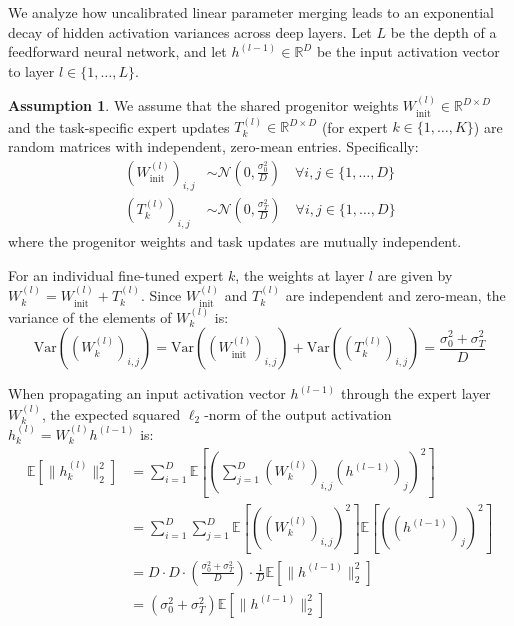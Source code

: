 \documentclass{article}
\theoremstyle{plain}
\theoremstyle{definition}
\newtheorem{assumption}[theorem]{Assumption}
\theoremstyle{remark}
\begin{document}
We analyze how uncalibrated linear parameter merging leads to an exponential decay of hidden activation variances across deep layers. Let $L$ be the depth of a feedforward neural network, and let $h^{(l-1)} \in \mathbb{R}^D$ be the input activation vector to layer $l \in \{1, \dots, L\}$. 

\begin{assumption}
We assume that the shared progenitor weights $W_{\text{init}}^{(l)} \in \mathbb{R}^{D \times D}$ and the task-specific expert updates $T_k^{(l)} \in \mathbb{R}^{D \times D}$ (for expert $k \in \{1, \dots, K\}$) are random matrices with independent, zero-mean entries. Specifically:
\begin{align}
    (W_{\text{init}}^{(l)})_{i,j} &\sim \mathcal{N}\left(0, \frac{\sigma_0^2}{D}\right) \quad \forall i, j \in \{1, \dots, D\} \\
    (T_k^{(l)})_{i,j} &\sim \mathcal{N}\left(0, \frac{\sigma_T^2}{D}\right) \quad \forall i, j \in \{1, \dots, D\}
\end{align}
where the progenitor weights and task updates are mutually independent.
\label{ass:weights_dist}
\end{assumption}

For an individual fine-tuned expert $k$, the weights at layer $l$ are given by $W_k^{(l)} = W_{\text{init}}^{(l)} + T_k^{(l)}$. Since $W_{\text{init}}^{(l)}$ and $T_k^{(l)}$ are independent and zero-mean, the variance of the elements of $W_k^{(l)}$ is:
\begin{equation}
    \text{Var}\left( (W_k^{(l)})_{i,j} \right) = \text{Var}\left( (W_{\text{init}}^{(l)})_{i,j} \right) + \text{Var}\left( (T_k^{(l)})_{i,j} \right) = \frac{\sigma_0^2 + \sigma_T^2}{D}
\end{equation}

When propagating an input activation vector $h^{(l-1)}$ through the expert layer $W_k^{(l)}$, the expected squared $\ell_2$-norm of the output activation $h_k^{(l)} = W_k^{(l)} h^{(l-1)}$ is:
\begin{align}
    \mathbb{E}\left[ \|h_k^{(l)}\|_2^2 \right] &= \sum_{i=1}^D \mathbb{E}\left[ \left( \sum_{j=1}^D (W_k^{(l)})_{i,j} (h^{(l-1)})_j \right)^2 \right] \nonumber \\
    &= \sum_{i=1}^D \sum_{j=1}^D \mathbb{E}\left[ \left( (W_k^{(l)})_{i,j} \right)^2 \right] \mathbb{E}\left[ \left( (h^{(l-1)})_j \right)^2 \right] \nonumber \\
    &= D \cdot D \cdot \left( \frac{\sigma_0^2 + \sigma_T^2}{D} \right) \cdot \frac{1}{D} \mathbb{E}\left[ \|h^{(l-1)}\|_2^2 \right] \nonumber \\
    &= (\sigma_0^2 + \sigma_T^2) \mathbb{E}\left[ \|h^{(l-1)}\|_2^2 \right]
\end{align}
\end{document}
